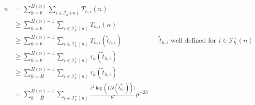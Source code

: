 \begin{align*}
    n & = \sum_{h=0}^{H(n)}\sum_{i\in\mathcal{I}_h(n)} T_{h,i}(n) \\
      &\geq \sum_{h=0}^{H(n)-1}\sum_{i\in\mathcal{I}_h^+(n)} T_{h,i}(n) \\
      & \geq \sum_{h=0}^{H(n)-1}\sum_{i\in\mathcal{I}_h^+(n)} T_{h,i}(\tilde{t}_{h,i}) && \text{$\tilde{t}_{h,i}$ well defined for $i\in\mathcal{I}_h^+(n)$} \\
      & \geq \sum_{h=0}^{H(n)-1}\sum_{i\in\mathcal{I}_h^+(n)} \tau_h(\tilde{t}_{h,i}) \\
      & \geq \sum_{h=\bar{H}}^{H(n)-1}\sum_{i\in\mathcal{I}_h^+(n)} \tau_h(\tilde{t}_{h,i}) \\
      & = \sum_{h=\bar{H}}^{H(n)-1}\sum_{i\in\mathcal{I}_h^+(n)} \frac{c^2\operatorname{log}(1/\tilde{\delta}(\tilde{t}_{h,i}^+)))}{\nu^2}\rho^{-2h}
         \end{align*}
